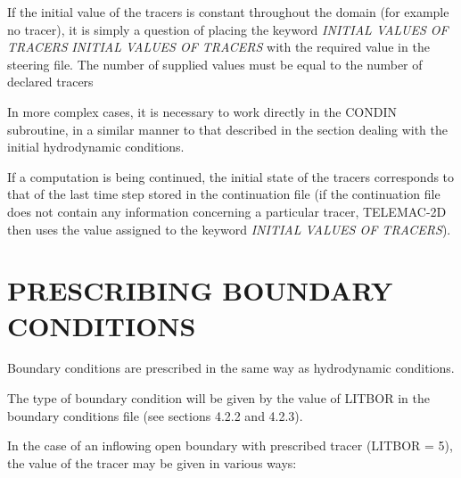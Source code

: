  If the initial value of the tracers is constant throughout the domain (for example no tracer), it is simply a question of placing the keyword \textit{INITIAL VALUES OF TRACERS} \textit{INITIAL VALUES OF TRACERS} with the required value in the steering file. The number of supplied values must be equal to the number of declared tracers

 In more complex cases, it is necessary to work directly in the CONDIN subroutine, in a similar manner to that described in the section dealing with the initial hydrodynamic conditions.

 If a computation is being continued, the initial state of the tracers corresponds to that of the last time step stored in the continuation file (if the continuation file does not contain any information concerning a particular tracer, TELEMAC-2D then uses the value assigned to the keyword \textit{INITIAL VALUES OF TRACERS}).


\section{ PRESCRIBING BOUNDARY CONDITIONS}

 Boundary conditions are prescribed in the same way as hydrodynamic conditions.

 The type of boundary condition will be given by the value of LITBOR in the boundary conditions file (see sections 4.2.2 and 4.2.3).

 In the case of an inflowing open boundary with prescribed tracer (LITBOR = 5), the value of the tracer may be given in various ways:

